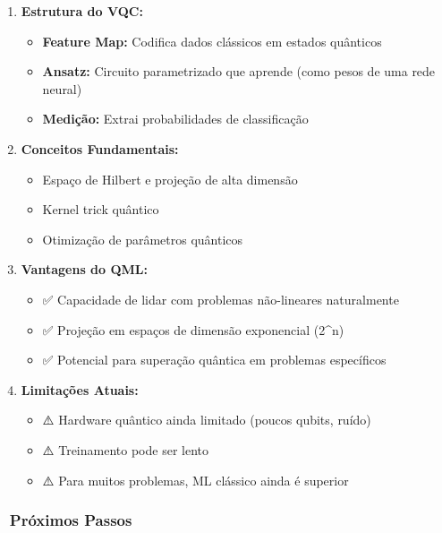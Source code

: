 \documentclass[
  brazilian,
]{report}
\providecommand{\tightlist}{%
  \setlength{\itemsep}{0pt}\setlength{\parskip}{0pt}}
\begin{document}
\begin{enumerate}
\def\labelenumi{\arabic{enumi}.}
\tightlist
\item
  \textbf{Estrutura do VQC:}

  \begin{itemize}
  \tightlist
  \item
    \textbf{Feature Map:} Codifica dados clássicos em estados quânticos
  \item
    \textbf{Ansatz:} Circuito parametrizado que aprende (como pesos de
    uma rede neural)
  \item
    \textbf{Medição:} Extrai probabilidades de classificação
  \end{itemize}
\item
  \textbf{Conceitos Fundamentais:}

  \begin{itemize}
  \tightlist
  \item
    Espaço de Hilbert e projeção de alta dimensão
  \item
    Kernel trick quântico
  \item
    Otimização de parâmetros quânticos
  \end{itemize}
\item
  \textbf{Vantagens do QML:}

  \begin{itemize}
  \tightlist
  \item
    ✅ Capacidade de lidar com problemas não-lineares naturalmente
  \item
    ✅ Projeção em espaços de dimensão exponencial (2\^{}n)
  \item
    ✅ Potencial para superação quântica em problemas específicos
  \end{itemize}
\item
  \textbf{Limitações Atuais:}

  \begin{itemize}
  \tightlist
  \item
    ⚠️ Hardware quântico ainda limitado (poucos qubits, ruído)
  \item
    ⚠️ Treinamento pode ser lento
  \item
    ⚠️ Para muitos problemas, ML clássico ainda é superior
  \end{itemize}
\end{enumerate}

\subsubsection{🚀 Próximos Passos}\label{pruxf3ximos-passos-3}
\end{document}
